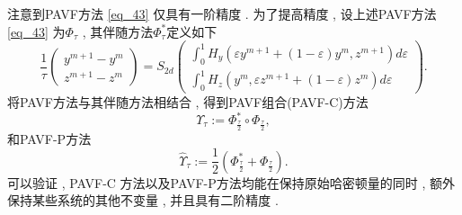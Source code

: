 注意到PAVF方法 \eqref{eq_43} 仅具有一阶精度\cite{caiPartitionedAveragedVector2018} . 为了提高精度 , 
设上述PAVF方法 \eqref{eq_43} 为$\Phi_{\tau}$ , 其伴随方法$\Phi_{\tau}^{*}$定义如下
\begin{equation}
\frac{1}{\tau}\left(\begin{array}{c}
y^{m+1}-y^{m} \\
z^{m+1}-z^{m}
\end{array}\right)=S_{2 d}\left(\begin{array}{c}
\int_{0}^{1} H_{y}\left(\varepsilon y^{m+1}+(1-\varepsilon) y^{m} , z^{m+1}\right) d \varepsilon \\
\int_{0}^{1} H_{z}\left(y^{m} , \varepsilon z^{m+1}+(1-\varepsilon) z^{m}\right) d \varepsilon
\end{array}\right) . 
\label{eq_44}\end{equation}
将PAVF方法与其伴随方法相结合 , 得到PAVF组合(PAVF-C)方法
\begin{equation}
\Upsilon_{\tau}:=\Phi_{\frac{\tau}{2}}^{*} \circ \Phi_{\frac{\tau}{2}} , 
\label{eq_45}\end{equation}
和PAVF-P方法
\begin{equation}
\hat{\Upsilon}_{\tau}:=\frac{1}{2}\left(\Phi_{\frac{\tau}{2}}^{*}+\Phi_{\frac{\tau}{2}}\right) . 
\label{eq_46}\end{equation}
可以验证 , PAVF-C 方法以及PAVF-P方法均能在保持原始哈密顿量的同时 , 额外保持某些系统的其他不变量 , 并且具有二阶精度\cite{caiPartitionedAveragedVector2018} . 
